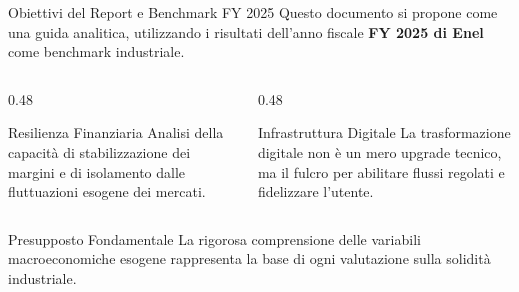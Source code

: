 \begin{frame}{Obiettivi del Report e Benchmark FY 2025}
    Questo documento si propone come una guida analitica, utilizzando i risultati dell'anno fiscale \textbf{FY 2025 di Enel} come benchmark industriale.
    \vspace{0.2cm}
    
    
    \begin{columns}[T]
        \begin{column}{0.48\textwidth}
            \begin{block}{Resilienza Finanziaria}
                Analisi della capacità di stabilizzazione dei margini e di isolamento dalle fluttuazioni esogene dei mercati.
            \end{block}
        \end{column}
        \pause
        
        \begin{column}{0.48\textwidth}
            \begin{block}{Infrastruttura Digitale}
                La trasformazione digitale non è un mero upgrade tecnico, ma il fulcro per abilitare flussi regolati e fidelizzare l'utente.
            \end{block}
        \end{column}
    \end{columns}
    \vspace{0.3cm}
    \pause
    
    \begin{alertblock}{Presupposto Fondamentale}
        La rigorosa comprensione delle variabili macroeconomiche esogene rappresenta la base di ogni valutazione sulla solidità industriale.
    \end{alertblock}
\end{frame}
